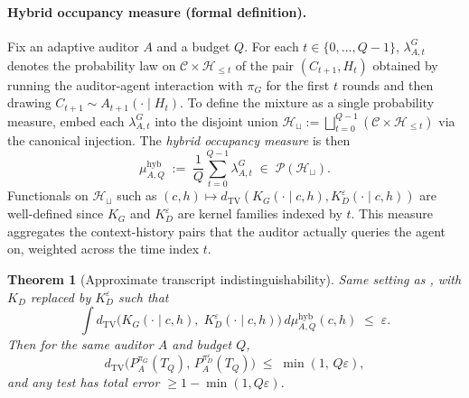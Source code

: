 \documentclass{article}
\theoremstyle{plain}
\newtheorem{theorem}{Theorem}
\theoremstyle{definition}
\theoremstyle{remark}
\newcommand{\TV}{\mathrm{TV}}
\newcommand{\dtv}{d_{\TV}}
\newcommand{\C}{\mathcal{C}}
\newcommand{\Hist}{\mathcal{H}}
\newcommand{\PpiA}[1]{P_A^{\pi_{#1}}}
\begin{document}
\paragraph{Hybrid occupancy measure (formal definition).}
Fix an adaptive auditor $A$ and a budget $Q$. For each $t \in \{0, \ldots, Q-1\}$,
$\lambda_{A, t}^G$ denotes the probability law on $\C \times \Hist_{\le t}$ of
the pair $(C_{t+1}, H_t)$ obtained by running the auditor-agent interaction
with $\pi_G$ for the first $t$ rounds and then drawing
$C_{t+1} \sim A_{t+1}(\cdot \mid H_t)$. To define the mixture as a single
probability measure, embed each $\lambda_{A, t}^G$ into the disjoint union
$\Hist_\sqcup := \bigsqcup_{t = 0}^{Q-1} (\C \times \Hist_{\le t})$ via the
canonical injection. The \emph{hybrid occupancy measure} is then
\[
\mu_{A, Q}^{\mathrm{hyb}} \;:=\; \frac{1}{Q} \sum_{t=0}^{Q-1} \lambda_{A, t}^{G}
\;\in\; \mathcal P(\Hist_\sqcup).
\]
Functionals on $\Hist_\sqcup$ such as $(c, h) \mapsto \dtv(K_G(\cdot \mid c, h),
K_D^\varepsilon(\cdot \mid c, h))$ are well-defined since $K_G$ and
$K_D^\varepsilon$ are kernel families indexed by $t$. This measure aggregates
the context-history pairs that the auditor actually queries the agent on,
weighted across the time index $t$.

\begin{theorem}[Approximate transcript indistinguishability]\label{thm:approx}
Same setting as , with $K_D$ replaced by
$K_D^\varepsilon$ such that
\begin{equation}\label{eq:hybrid-cond}
\int \dtv\!\big(K_G(\cdot \mid c, h),\; K_D^\varepsilon(\cdot \mid c, h)\big)\, d\mu_{A, Q}^{\mathrm{hyb}}(c, h) \;\le\; \varepsilon.
\end{equation}
Then for the same auditor $A$ and budget $Q$,
\[
\dtv\big(\PpiA{G}(T_Q),\, P_A^{\pi_D^\varepsilon}(T_Q)\big) \;\le\; \min(1,\, Q\varepsilon),
\]
and any test has total error $\ge 1 - \min(1, Q\varepsilon)$.
\end{theorem}
\end{document}

